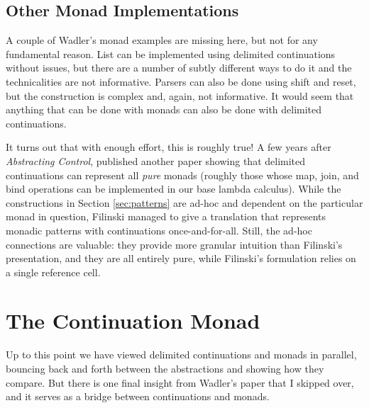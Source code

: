 \documentclass[acmsmall, nonacm, screen]{acmart}
\newcommand{\kw}[1]{\textsf{\color{ACMDarkBlue} #1}}
\begin{document}
\subsection{Other Monad Implementations}
A couple of Wadler's monad examples are missing here, but not for any fundamental reason.
\textsf{List} can be implemented using delimited continuations without issues, but there are a
number of subtly different ways to do it and the technicalities are not informative.
\textsf{Parser}s can also be done using \kw{shift} and \kw{reset}, but the construction is
complex and, again, not informative. It would seem that anything that can be done with monads can
also be done with delimited continuations.

It turns out that with enough effort, this is roughly true! A few years after {\em Abstracting
Control}, \citet{filinski1994representing} published another paper showing that delimited
continuations can represent all {\em pure} monads (roughly those whose \textsf{map}, \textsf{join},
and \textsf{bind} operations can be implemented in our base lambda calculus). While the
constructions in Section \ref{sec:patterns} are ad-hoc and dependent on the particular monad in
question, Filinski managed to give a translation that represents monadic patterns with
continuations once-and-for-all. Still, the ad-hoc connections are valuable: they provide more
granular intuition than Filinski's presentation, and they are all entirely pure, while Filinski's
formulation relies on a single reference cell.

\section{The Continuation Monad} \label{sec:contmonad}

Up to this point we have viewed delimited continuations and monads in parallel, bouncing back and
forth between the abstractions and showing how they compare. But there is one final insight from
Wadler's paper that I skipped over, and it serves as a bridge between continuations and monads.
\end{document}
